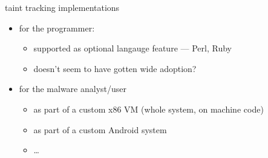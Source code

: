
\begin{frame}{taint tracking implementations}
    \begin{itemize}
        \item for the programmer:
            \begin{itemize}
            \item supported as optional langauge feature --- Perl, Ruby
            \item doesn't seem to have gotten wide adoption?
            \end{itemize}
        \vspace{.5cm}
        \item for the malware analyst/user
            \begin{itemize}
            \item as part of a custom x86 VM (whole system, on machine code)
            \item as part of a custom Android system
            \item \ldots
            \end{itemize}
    \end{itemize}
\end{frame}
